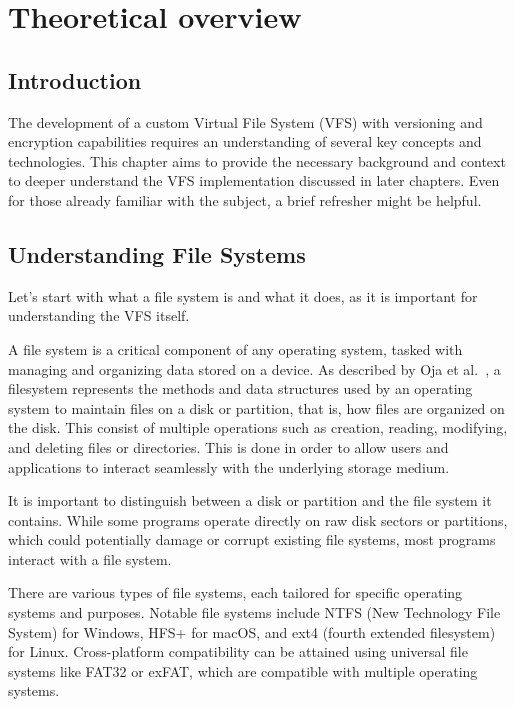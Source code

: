 \chapter{Theoretical overview}
\label{chap:refs}


\section{Introduction}\label{sec:introduction}

The development of a custom Virtual File System (VFS) with versioning and encryption capabilities requires an understanding of several key concepts and technologies.
This chapter aims to provide the necessary background and context to deeper understand the VFS implementation discussed in later chapters.
Even for those already familiar with the subject, a brief refresher might be helpful.


\section{Understanding File Systems}\label{sec:file-systems}

Let's start with what a file system is and what it does, as it is important for understanding the VFS itself.

A file system is a critical component of any operating system, tasked with managing and organizing data stored on a device.
As described by Oja et al.~\cite{oja-fs}, a filesystem represents the methods and data structures used by an operating system to maintain files on a disk or partition, that is, how files are organized on the disk.
This consist of multiple operations such as creation, reading, modifying, and deleting files or directories.
This is done in order to allow users and applications to interact seamlessly with the underlying storage medium.

It is important to distinguish between a disk or partition and the file system it contains.
While some programs operate directly on raw disk sectors or partitions, which could potentially damage or corrupt existing file systems, most programs interact with a file system.

There are various types of file systems, each tailored for specific operating systems and purposes.
Notable file systems include NTFS (New Technology File System) for Windows, HFS+ for macOS, and ext4 (fourth extended filesystem) for Linux.
Cross-platform compatibility can be attained using universal file systems like FAT32 or exFAT, which are compatible with multiple operating systems.

